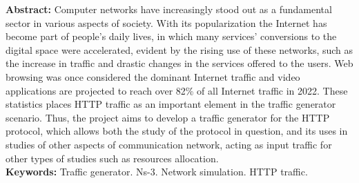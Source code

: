 \begin{singlespace}
\textbf{Abstract: }
Computer networks have increasingly stood out as a fundamental sector in various aspects of society. With its popularization the Internet has become part of people's daily lives, in which many services' conversions to the digital space were accelerated, evident by the rising use of these networks, such as the increase in traffic and drastic changes in the services offered to the users. Web browsing was once considered the dominant Internet traffic and video applications are projected to reach over 82\% of all Internet traffic in 2022. These statistics places HTTP traffic as an important element in the traffic generator scenario. Thus, the project aims to develop a traffic generator for the HTTP protocol, which allows both the study of the protocol in question, and its uses in studies of other aspects of communication network, acting as input traffic for other types of studies such as resources allocation.\\
\textbf{Keywords: }
Traffic generator. Ns-3. Network simulation. HTTP traffic.
\end{singlespace}
